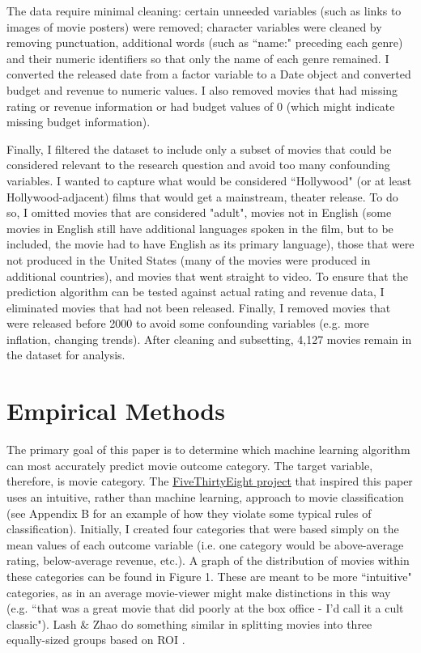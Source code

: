 \documentclass[12pt,english]{article}
\begin{document}
The data require minimal cleaning: certain unneeded variables (such as links to images of movie posters) were removed; character variables were cleaned by removing punctuation, additional words (such as ``name:" preceding each genre) and their numeric identifiers so that only the name of each genre remained. I converted the released date from a factor variable to a Date object and converted budget and revenue to numeric values. I also removed movies that had missing rating or revenue information or had budget values of 0 (which might indicate missing budget information).

Finally, I filtered the dataset to include only a subset of movies that could be considered relevant to the research question and avoid too many confounding variables. I wanted to capture what would be considered ``Hollywood" (or at least Hollywood-adjacent) films that would get a mainstream, theater release. To do so, I omitted movies that are considered "adult", movies not in English (some movies in English still have additional languages spoken in the film, but to be included, the movie had to have English as its primary language), those that were not produced in the United States (many of the movies were produced in additional countries), and movies that went straight to video. To ensure that the prediction algorithm can be tested against actual rating and revenue data, I eliminated movies that had not been released. Finally, I removed movies that were released before 2000 to avoid some confounding variables (e.g. more inflation, changing trends). After cleaning and subsetting, 4,127 movies remain in the dataset for analysis.

\section{Empirical Methods}
The primary goal of this paper is to determine which machine learning algorithm can most accurately predict movie outcome category. The target variable, therefore, is movie category. The \href{https://fivethirtyeight.com/tag/hollywood-taxonomy/}{FiveThirtyEight project} that inspired this paper uses an intuitive, rather than machine learning, approach to movie classification (see Appendix B for an example of how they violate some typical rules of classification). Initially, I created four categories that were based simply on the mean values of each outcome variable (i.e. one category would be above-average rating, below-average revenue, etc.). A graph of the distribution of movies within these categories can be found in Figure 1. These are meant to be more ``intuitive" categories, as in an average movie-viewer might make distinctions in this way (e.g. ``that was a great movie that did poorly at the box office - I'd call it a cult classic"). Lash \& Zhao do something similar in splitting movies into three equally-sized groups based on ROI \citep{lash}.
\end{document}
